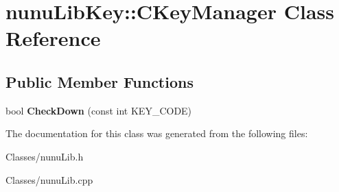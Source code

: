 \hypertarget{classnunu_lib_key_1_1_c_key_manager}{}\section{nunu\+Lib\+Key\+:\+:C\+Key\+Manager Class Reference}
\label{classnunu_lib_key_1_1_c_key_manager}
\subsection*{Public Member Functions}
\begin{DoxyCompactItemize}
\item 
bool {\bfseries Check\+Down} (const int K\+E\+Y\+\_\+\+C\+O\+DE)\hypertarget{classnunu_lib_key_1_1_c_key_manager_a5ea2d1b8c07df198fe98998af53a1d75}{}\label{classnunu_lib_key_1_1_c_key_manager_a5ea2d1b8c07df198fe98998af53a1d75}

\end{DoxyCompactItemize}


The documentation for this class was generated from the following files\+:\begin{DoxyCompactItemize}
\item 
Classes/nunu\+Lib.\+h\item 
Classes/nunu\+Lib.\+cpp\end{DoxyCompactItemize}
